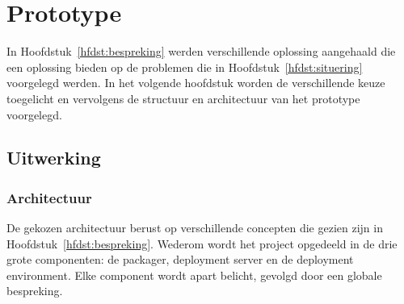 \chapter{Prototype}
In Hoofdstuk~\vref{hfdst:bespreking} werden verschillende oplossing aangehaald die een oplossing bieden op de problemen die in Hoofdstuk~\vref{hfdst:situering} voorgelegd werden.
In het volgende hoofdstuk worden de verschillende keuze toegelicht en vervolgens de structuur en architectuur van het prototype voorgelegd.

\section{Uitwerking}

\subsection{Architectuur}
De gekozen architectuur berust op verschillende concepten die gezien zijn in Hoofdstuk~\vref{hfdst:bespreking}.
Wederom wordt het project opgedeeld in de drie grote componenten: de packager, deployment server en de deployment environment.
Elke component wordt apart belicht, gevolgd door een globale bespreking.


